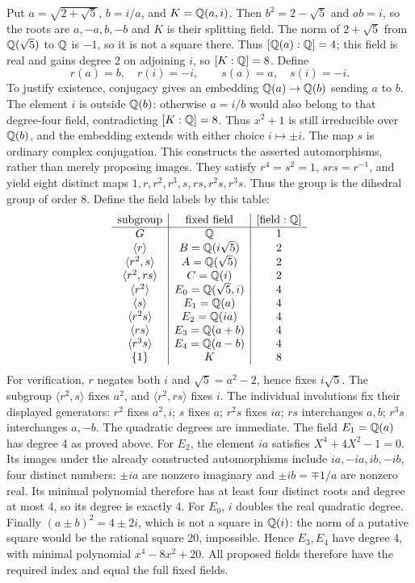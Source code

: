 Put $a=\sqrt{2+\sqrt5}$, $b=i/a$, and $K=\mathbb{Q}(a,i)$. Then $b^2=2-\sqrt5$ and $ab=i$, so the roots are $a,-a,b,-b$ and $K$ is their splitting field. The norm of $2+\sqrt5$ from $\mathbb{Q}(\sqrt5)$ to $\mathbb{Q}$ is $-1$, so it is not a square there. Thus $[\mathbb{Q}(a):\mathbb{Q}]=4$; this field is real and gains degree 2 on adjoining $i$, so $[K:\mathbb{Q}]=8$.
 Define
\[r(a)=b,\quad r(i)=-i,\qquad s(a)=a,\quad s(i)=-i.\]
To justify existence, conjugacy gives an embedding $\mathbb{Q}(a)\to\mathbb{Q}(b)$ sending $a$ to $b$. The element $i$ is outside $\mathbb{Q}(b)$: otherwise $a=i/b$ would also belong to that degree-four field, contradicting $[K:\mathbb{Q}]=8$. Thus $x^2+1$ is still irreducible over $\mathbb{Q}(b)$, and the embedding extends with either choice $i\mapsto\pm i$. The map $s$ is ordinary complex conjugation. This constructs the asserted automorphisms, rather than merely proposing images. They satisfy $r^4=s^2=1$, $srs=r^{-1}$, and yield eight distinct maps $1,r,r^2,r^3,s,rs,r^2s,r^3s$. Thus the group is the dihedral group of order 8.
 Define the field labels by this table:
\[
\begin{array}{c|c|c}
\text{subgroup}&\text{fixed field}&[\text{field}:\mathbb{Q}]\\\hline
G&\mathbb{Q}&1\\
\langle r\rangle&B=\mathbb{Q}(i\sqrt5)&2\\
\langle r^2,s\rangle&A=\mathbb{Q}(\sqrt5)&2\\
\langle r^2,rs\rangle&C=\mathbb{Q}(i)&2\\
\langle r^2\rangle&E_0=\mathbb{Q}(\sqrt5,i)&4\\
\langle s\rangle&E_1=\mathbb{Q}(a)&4\\
\langle r^2s\rangle&E_2=\mathbb{Q}(ia)&4\\
\langle rs\rangle&E_3=\mathbb{Q}(a+b)&4\\
\langle r^3s\rangle&E_4=\mathbb{Q}(a-b)&4\\
\{1\}&K&8
\end{array}
\]
For verification, $r$ negates both $i$ and $\sqrt5=a^2-2$, hence fixes $i\sqrt5$. The subgroup $\langle r^2,s\rangle$ fixes $a^2$, and $\langle r^2,rs\rangle$ fixes $i$. The individual involutions fix their displayed generators: $r^2$ fixes $a^2,i$; $s$ fixes $a$; $r^2s$ fixes $ia$; $rs$ interchanges $a,b$; $r^3s$ interchanges $a,-b$.
The quadratic degrees are immediate. The field $E_1=\mathbb{Q}(a)$ has degree 4 as proved above. For $E_2$, the element $ia$ satisfies $X^4+4X^2-1=0$. Its images under the already constructed automorphisms include $ia,-ia,ib,-ib$, four distinct numbers: $\pm ia$ are nonzero imaginary and $\pm ib=\mp1/a$ are nonzero real. Its minimal polynomial therefore has at least four distinct roots and degree at most 4, so its degree is exactly 4. For $E_0$, $i$ doubles the real quadratic degree. Finally $(a\pm b)^2=4\pm2i$, which is not a square in $\mathbb{Q}(i)$: the norm of a putative square would be the rational square 20, impossible. Hence $E_3,E_4$ have degree 4, with minimal polynomial $x^4-8x^2+20$. All proposed fields therefore have the required index and equal the full fixed fields.
